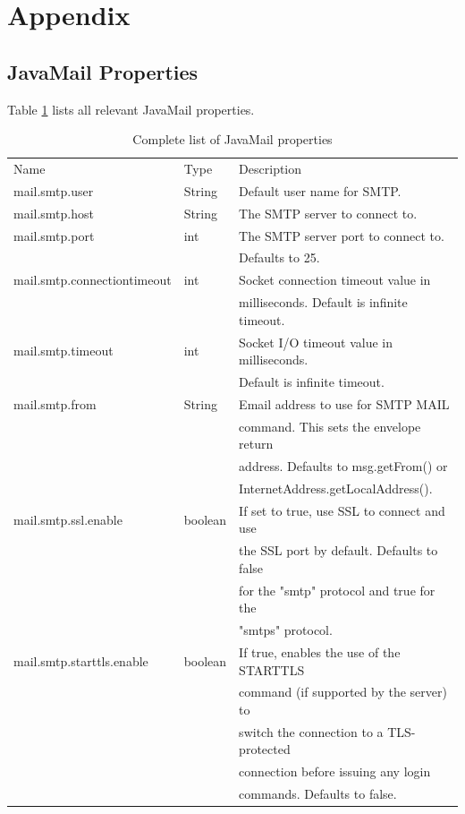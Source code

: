 \documentclass[envcountsame,envcountchap]{svmono}
\begin{document}
\part*{Appendix}

\chapter*{JavaMail Properties}

Table \ref{tab:javamail-properties} lists all relevant JavaMail properties.

\begin{table}
\centering
\caption{Complete list of JavaMail properties}
\label{tab:javamail-properties}
\begin{tabular}{lll}
\hline\noalign{\smallskip}
Name & Type & Description  \\
\noalign{\smallskip}\hline\noalign{\smallskip}
mail.smtp.user & String & Default user name for SMTP. \\
mail.smtp.host & String & The SMTP server to connect to. \\
mail.smtp.port & int & The SMTP server port to connect to.\\ & & Defaults to 25. \\
mail.smtp.connectiontimeout & int & Socket connection timeout value in \\ & & milliseconds. Default is infinite timeout.\\
mail.smtp.timeout & int & Socket I/O timeout value in milliseconds. \\ & & Default is infinite timeout. \\
mail.smtp.from & String & Email address to use for SMTP MAIL \\ & & command. This sets the envelope return \\ & & address. Defaults to msg.getFrom() or \\ & & InternetAddress.getLocalAddress(). \\
mail.smtp.ssl.enable & boolean & If set to true, use SSL to connect and use \\ & & the SSL port by default. Defaults to false \\ & & for the "smtp" protocol and true for the \\ & & "smtps" protocol. \\
mail.smtp.starttls.enable & boolean & If true, enables the use of the STARTTLS\\ & & command (if supported by the server) to\\ & & switch the connection to a TLS-protected\\ & & connection before issuing any login\\ & & commands. Defaults to false. \\

\end{tabular}
\end{table}
\end{document}
